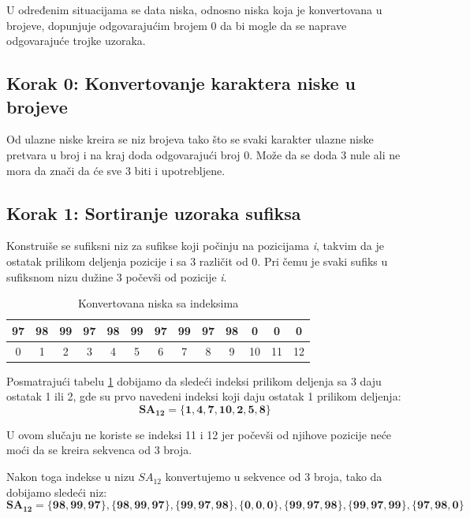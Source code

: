 \documentclass{article}
\begin{document}
U određenim situacijama se data niska, odnosno niska koja je konvertovana u brojeve, dopunjuje odgovarajućim brojem 0 da bi mogle da se naprave odgovarajuće trojke uzoraka.

 \subsection{Korak 0: Konvertovanje karaktera niske u brojeve}
Od ulazne niske kreira se niz brojeva tako što se svaki karakter ulazne niske pretvara u broj i na kraj doda odgovarajući broj 0. Može da se doda 3 nule ali ne mora da znači da će sve 3 biti i upotrebljene. 

\subsection{Korak 1: Sortiranje uzoraka sufiksa}
Konstruiše se sufiksni niz za sufikse koji počinju na pozicijama \textit{i}, takvim da je ostatak prilikom deljenja pozicije i sa 3 različit od 0. Pri čemu je svaki sufiks u sufiksnom nizu dužine 3 počevši od pozicije \textit{i}.

\begin{table}[h!]
    \begin{center}
        \begin{tabular}{|c|c|c|c|c|c|c|c|c|c|c|c|c|} \hline
        97 & 98 & 99 & 97 & 98 & 99 & 97 & 99 & 97 & 98 & 0 & 0 & 0\\ \hline
        0 & 1 & 2 & 3 & 4 & 5 & 6 & 7 & 8 & 9 & 10 & 11 & 12\\ \hline
        \end{tabular}
        \caption{Konvertovana niska sa indeksima}
        \label{table:2}
    \end{center}
\end{table}

Posmatrajući tabelu \ref{table:2} dobijamo da sledeći indeksi prilikom deljenja sa 3 daju ostatak 1 ili 2, gde su prvo navedeni indeksi koji daju ostatak 1 prilikom deljenja:
\begin{equation}
\mathbf{SA_{12} = \{1, 4, 7, 10, 2, 5, 8\}}
\end{equation}

U ovom slučaju ne koriste se indeksi 11 i 12 jer počevši od njihove pozicije neće moći da se kreira sekvenca od 3 broja.

Nakon toga indekse u nizu \(SA_{12}\) konvertujemo u sekvence od 3 broja, tako da dobijamo sledeći niz:
\begin{equation}
\mathbf{SA_{12} = \{98, 99, 97\}, \{98, 99, 97\}, \{99, 97, 98\} , \{0, 0, 0\} , \{99, 97, 98\} , \{99, 97, 99\} , \{97, 98, 0\} }
\end{equation}
\end{document}
